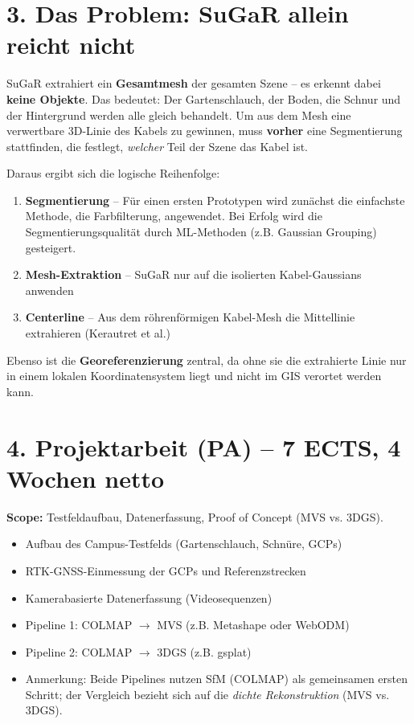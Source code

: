 \documentclass[11pt, a4paper]{article}
\begin{document}
\section*{3. Das Problem: SuGaR allein reicht nicht}

SuGaR extrahiert ein \textbf{Gesamtmesh} der gesamten Szene -- es erkennt dabei \textbf{keine Objekte}. Das bedeutet: Der Gartenschlauch, der Boden, die Schnur und der Hintergrund werden alle gleich behandelt. Um aus dem Mesh eine verwertbare 3D-Linie des Kabels zu gewinnen, muss \textbf{vorher} eine Segmentierung stattfinden, die festlegt, \textit{welcher} Teil der Szene das Kabel ist.

Daraus ergibt sich die logische Reihenfolge:
\begin{enumerate}[noitemsep]
    \item \textbf{Segmentierung} -- Für einen ersten Prototypen wird zunächst die einfachste Methode, die Farbfilterung, angewendet. Bei Erfolg wird die Segmentierungsqualität durch ML-Methoden (z.B. Gaussian Grouping) gesteigert.
    \item \textbf{Mesh-Extraktion} -- SuGaR nur auf die isolierten Kabel-Gaussians anwenden
    \item \textbf{Centerline} -- Aus dem röhrenförmigen Kabel-Mesh die Mittellinie extrahieren (Kerautret et al.)
\end{enumerate}

Ebenso ist die \textbf{Georeferenzierung} zentral, da ohne sie die extrahierte Linie nur in einem lokalen Koordinatensystem liegt und nicht im GIS verortet werden kann.

\section*{4. Projektarbeit (PA) -- 7 ECTS, 4 Wochen netto}

\textbf{Scope:} Testfeldaufbau, Datenerfassung, Proof of Concept (MVS vs. 3DGS).

\begin{itemize}[noitemsep]
    \item Aufbau des Campus-Testfelds (Gartenschlauch, Schnüre, GCPs)
    \item RTK-GNSS-Einmessung der GCPs und Referenzstrecken
    \item Kamerabasierte Datenerfassung (Videosequenzen)
    \item Pipeline 1: COLMAP $\rightarrow$ MVS (z.B. Metashape oder WebODM)
    \item Pipeline 2: COLMAP $\rightarrow$ 3DGS (z.B. gsplat)
    \item Anmerkung: Beide Pipelines nutzen SfM (COLMAP) als gemeinsamen ersten Schritt; der Vergleich bezieht sich auf die \textit{dichte Rekonstruktion} (MVS vs. 3DGS).
\end{itemize}
\end{document}

